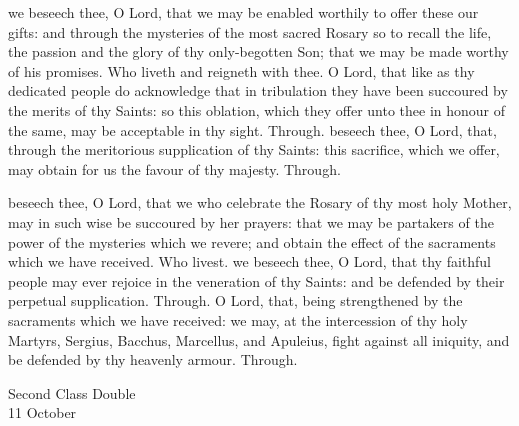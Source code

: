 \secret
{} we beseech thee, O Lord, that we may be enabled worthily to offer these our gifts: and through the mysteries of the most sacred Rosary so to recall the life, the passion and the glory of thy only-begotten Son; that we may be made worthy of his promises. Who liveth and reigneth with thee.
 O Lord, that like as thy dedicated people do acknowledge that in tribulation they have been succoured by the merits of thy Saints: so this oblation, which they offer unto thee in honour of the same, may be acceptable in thy sight. Through.
 beseech thee, O Lord, that, through the meritorious supplication of thy Saints: this sacrifice, which we offer, may obtain for us the favour of thy majesty. Through.


\postcommunion
{} beseech thee, O Lord, that we who celebrate the Rosary of thy most holy Mother, may in such wise be succoured by her prayers: that we may be partakers of the power of the mysteries which we revere; and obtain the effect of the sacraments which we have received. Who livest.
 we beseech thee, O Lord, that thy faithful people may ever rejoice in the veneration of thy Saints: and be defended by their perpetual supplication. Through.
 O Lord, that, being strengthened by the sacraments which we have received: we may, at the intercession of thy holy Martyrs, Sergius, Bacchus, Marcellus, and Apuleius, fight against all iniquity, and be defended by thy heavenly armour. Through.


\begin{inhead}
    {Second Class Double\\
11 October}
\end{inhead}
\par\noindent

